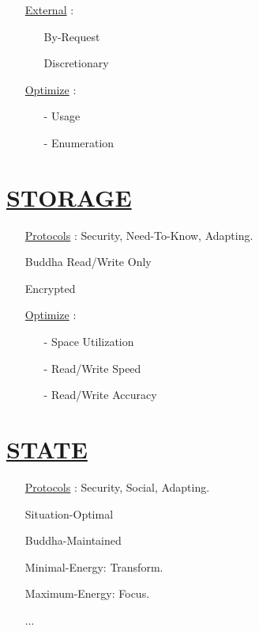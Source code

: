\documentclass[11pt]{article}
\begin{document}
\begin{enumerate}
\begin{enumerate}
		\item[] \ul{External} :
		\begin{enumerate}
			\item[] By-Request
			\item[] Discretionary
		\end{enumerate}

		\item[] \ul{Optimize}  :
		\begin{enumerate}
			\item[-] Usage
			\item[-] Enumeration
		\end{enumerate}
	\end{enumerate}
\end{enumerate}


\section*{\ul{STORAGE}}
\begin{enumerate}
	\item[] \ul{Protocols} : Security, Need-To-Know, Adapting.
	\item[] Buddha Read/Write Only
	\item[] Encrypted
	\item[] \ul{Optimize}  :
	\begin{enumerate}
		\item[-] Space Utilization
		\item[-] Read/Write Speed
		\item[-] Read/Write Accuracy
	\end{enumerate}
\end{enumerate}


\section*{\ul{STATE}}
\begin{enumerate}
	\item[] \ul{Protocols} : Security, Social, Adapting.
	\item[] Situation-Optimal
	\item[] Buddha-Maintained
	\item[] Minimal-Energy: Transform.
	\item[] Maximum-Energy: Focus.
	\item[] ...
\end{enumerate}
\end{document}
